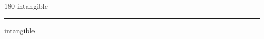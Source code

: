 
\begin{frame}
\begin{center}
\begin{turn}{180}
{\fontsize{2.5cm}{1em}\selectfont intangible}
\end{turn}
\vspace{1em}\par  
\hrule
\vspace{1em}\par  
{\fontsize{2.5cm}{1em}\selectfont intangible}
\end{center}
\end{frame}
